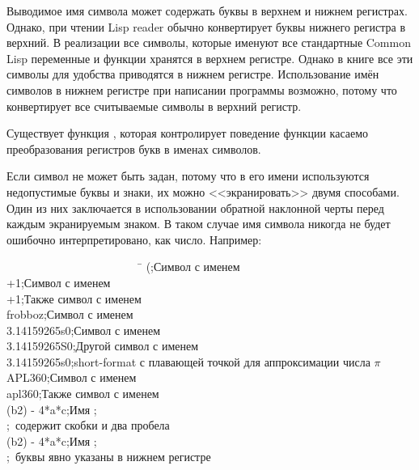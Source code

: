 Выводимое имя символа может содержать буквы в верхнем и нижнем регистрах.
Однако, при чтении Lisp reader обычно конвертирует буквы нижнего регистра в
верхний.
В реализации все символы, которые именуют все стандартные Common Lisp переменные
и функции хранятся в верхнем регистре. Однако в книге все эти символы для
удобства приводятся в нижнем регистре. Использование имён символов в нижнем
регистре при написании программы возможно, потому что  конвертирует все
считываемые символы в верхний регистр.

Существует функция , которая контролирует поведение функции
 касаемо преобразования регистров букв в именах символов.

Если символ не может быть задан, потому что в его имени используются
недопустимые буквы и знаки, их можно <<экранировать>> двумя способами. Один из
них заключается в использовании обратной наклонной черты перед каждым
экранируемым знаком. В таком случае имя символа никогда не будет ошибочно
интерпретировано, как число.
Например:
\begin{lisp}
~~~~~~~~~~~~~~~~~~~~~~~~\=\kill
{\Xbackslash}(\>;\textrm{Символ с именем \cd{(}} \\
{\Xbackslash}+1\>;\textrm{Символ с именем } \\
+{\Xbackslash}1\>;\textrm{Также символ с именем } \\
{\Xbackslash}frobboz\>;\textrm{Символ с именем } \\
3.14159265{\Xbackslash}s0\>;\textrm{Символ с именем } \\
3.14159265{\Xbackslash}S0\>;\textrm{Другой символ с именем } \\
3.14159265s0\>;\textrm{short-format с плавающей точкой для аппроксимации числа $\pi$} \\
APL{\Xbackslash}{\Xbackslash}360\>;\textrm{Символ с именем } \\
apl{\Xbackslash}{\Xbackslash}360\>;\textrm{Также символ с именем } \\
{\Xbackslash}(b{\Xcircumflex}2{\Xbackslash}){\Xbackslash} -{\Xbackslash} 4*a*c\>;\textrm{Имя ;} \\
\>;~\textrm{содержит скобки и два пробела} \\
{\Xbackslash}({\Xbackslash}b{\Xcircumflex}2{\Xbackslash}){\Xbackslash} -{\Xbackslash} 4*{\Xbackslash}a*{\Xbackslash}c\>;\textrm{Имя ;} \\
\>;~\textrm{буквы явно указаны в нижнем регистре}
\end{lisp}

